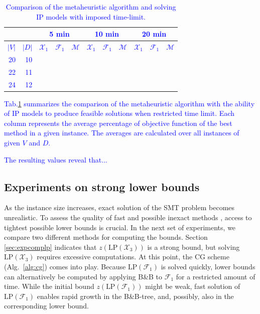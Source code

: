 \begin{table}[]
\centering
\textcolor{blue}{
\begin{tabular}{rrrrrrrrrrr}
\multicolumn{1}{l}{}      & \multicolumn{1}{l}{}      & \multicolumn{3}{c}{5 min}  & \multicolumn{3}{c}{10 min} & \multicolumn{3}{c}{20 min}     \\\hline
\multicolumn{1}{l}{$|V|$} & \multicolumn{1}{l}{$|D|$} & \multicolumn{1}{l}{$\mathcal{X}_1$} & \multicolumn{1}{l}{$\mathcal{F}_1$} & \multicolumn{1}{l}{$\mathcal{M}$} & \multicolumn{1}{l}{$\mathcal{X}_1$} & \multicolumn{1}{l}{$\mathcal{F}_1$} & \multicolumn{1}{l}{$\mathcal{M}$} & \multicolumn{1}{l}{$\mathcal{X}_1$} & \multicolumn{1}{l}{$\mathcal{F}_1$} & \multicolumn{1}{l}{$\mathcal{M}$} \\\hline
20  & 10   &     &   &   &   &    &    &    &    &       \\
22  & 11   &     &   &   &   &    &    &    &    &       \\
24  & 12   &     &   &   &   &    &    &    &    &                                  
\end{tabular}
}
\caption{\textcolor{blue}{Comparison of the metaheuristic algorithm and solving IP models with imposed time-limit.}}
\label{tab:metamod}
\end{table}

\textcolor{blue}{
Tab.\ref{tab:metamod} summarizes the comparison of the metaheuristic algorithm with the ability of IP models to produce feasible solutions when restricted time limit.
Each column represents the average percentage of objective function of the best method in a given instance.
The averages are calculated over all instances of given $V$ and $D$.
}

\textcolor{blue}{
The resulting values reveal that...
}

\subsection{Experiments on strong lower bounds}

As the instance size increases, exact solution of the SMT problem becomes unrealistic.
To assess the quality of fast and possible inexact methods \citep{ivanova16isco}, access to tightest possible lower bounds is crucial.
In the next set of experiments, we compare two different methods for computing the bounds.
Section \ref{sec:expcomplp} indicates that $z\left(\text{LP}(\mathcal{X}_3)\right)$ is a strong bound,
but solving $\text{LP}(\mathcal{X}_3)$ requires excessive computations.
At this point, the CG scheme (Alg.\ \ref{alg:cg}) comes into play.
Because $\text{LP}(\mathcal{F}_1)$ is solved quickly, lower bounds can alternatively be computed 
by applying B\&B to $\mathcal{F}_1$ for a restricted amount of time.
While the initial bound $z\left(\text{LP}(\mathcal{F}_1)\right)$ might be weak, fast solution of $\text{LP}(\mathcal{F}_1)$ enables rapid growth in the B\&B-tree,
and, possibly, also in the corresponding lower bound.

